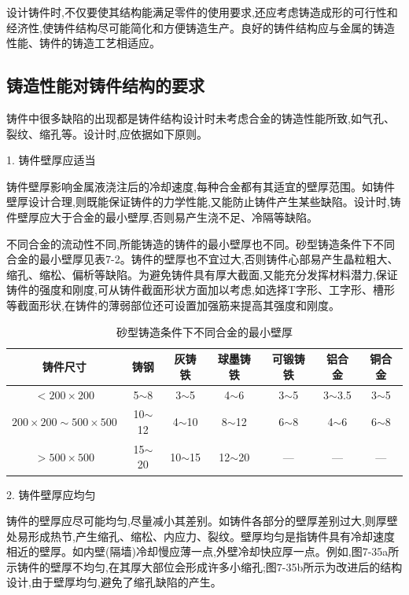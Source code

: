 \documentclass[UTF8]{ctexbook}
\newcommand{\◎}{\ensuremath{\bigcirc}}
\begin{document}
设计铸件时,不仅要使其结构能满足零件的使用要求,还应考虑铸造成形的可行性和经济性,使铸件结构尽可能简化和方便铸造生产。良好的铸件结构应与金属的铸造性能、铸件的铸造工艺相适应。

\subsection{铸造性能对铸件结构的要求}

铸件中很多缺陷的出现都是铸件结构设计时未考虑合金的铸造性能所致,如气孔、裂纹、缩孔等。设计时,应依据如下原则。

1. 铸件壁厚应适当

铸件壁厚影响金属液浇注后的冷却速度,每种合金都有其适宜的壁厚范围。如铸件壁厚设计合理,则既能保证铸件的力学性能,又能防止铸件产生某些缺陷。设计时,铸件壁厚应大于合金的最小壁厚,否则易产生浇不足、冷隔等缺陷。

不同合金的流动性不同,所能铸造的铸件的最小壁厚也不同。砂型铸造条件下不同合金的最小壁厚见表7-2。铸件的壁厚也不宜过大,否则铸件心部易产生晶粒粗大、缩孔、缩松、偏析等缺陷。为避免铸件具有厚大截面,又能充分发挥材料潜力,保证铸件的强度和刚度,可从铸件截面形状方面加以考虑,如选择T字形、工字形、槽形等截面形状,在铸件的薄弱部位还可设置加强筋来提高其强度和刚度。

\begin{table}[H]
\centering
\caption{砂型铸造条件下不同合金的最小壁厚}
\label{tab:7-2}
\small
\begin{tabular}{|c|c|c|c|c|c|c|}
\hline
铸件尺寸 & 铸钢 & 灰铸铁 & 球墨铸铁 & 可锻铸铁 & 铝合金 & 铜合金 \\
\hline
$<200 \times 200$ & 5$\sim$8 & 3$\sim$5 & 4$\sim$6 & 3$\sim$5 & 3$\sim$3.5 & 3$\sim$5 \\
\hline
$200 \times 200 \sim 500 \times 500$ & 10$\sim$12 & 4$\sim$10 & 8$\sim$12 & 6$\sim$8 & 4$\sim$6 & 6$\sim$8 \\
\hline
$>500 \times 500$ & 15$\sim$20 & 10$\sim$15 & 12$\sim$20 & --- & --- & --- \\
\hline
\end{tabular}\end{table}

2. 铸件壁厚应均匀

铸件的壁厚应尽可能均匀,尽量减小其差别。如铸件各部分的壁厚差别过大,则厚壁处易形成热节,产生缩孔、缩松、内应力、裂纹。壁厚均匀是指铸件具有冷却速度相近的壁厚。如内壁(隔墙)冷却慢应薄一点,外壁冷却快应厚一点。例如,图7-35a所示铸件的壁厚不均匀,在其厚大部位会形成许多小缩孔;图7-35b所示为改进后的结构设计,由于壁厚均匀,避免了缩孔缺陷的产生。
\end{document}
